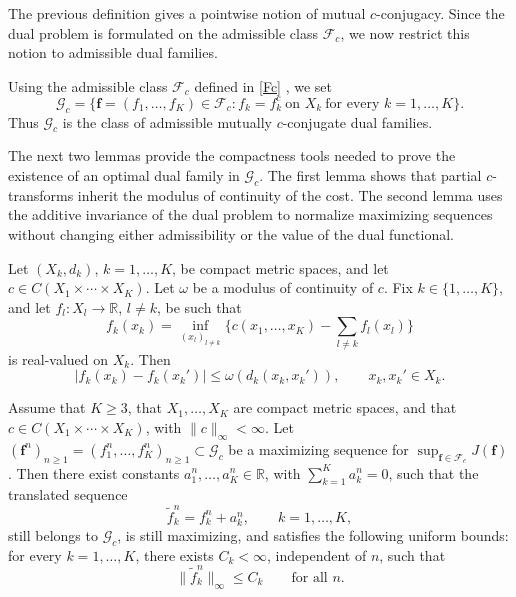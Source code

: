 \documentclass[twoside,11pt,a4paper]{article}
\newcommand*{\SavedEqref}{}
\let\SavedEqref\eqref
\renewcommand*{\eqref}[1]{  \begingroup
    \hypersetup{
      linkcolor=linkequation,
      linkbordercolor=linkequation,
    }    \SavedEqref{#1}  \endgroup
}
\begin{document}
The previous definition gives a pointwise notion of mutual \(c\)-conjugacy. Since the dual problem is formulated on the admissible class \(\mathcal F_c\), we now restrict this notion to admissible dual families.


\begin{definition}\label{Gc}
Using the admissible class \(\mathcal F_c\) defined in \eqref{Fc}, we set
\[
\mathcal G_c
=
\Big\{
\boldsymbol f=(f_1,\ldots,f_K)\in\mathcal F_c:
 f_k=f_k^{c}\ \text{on }X_k
\ \text{for every }k=1,\ldots,K
\Big\}.
\]
Thus \(\mathcal G_c\) is the class of admissible mutually \(c\)-conjugate dual
families.
\end{definition}
\medskip

The next two lemmas provide the compactness tools needed to prove the existence of an optimal dual family in \(\mathcal G_c\). The first lemma shows that partial \(c\)-transforms inherit the modulus of continuity of the cost. The second lemma uses the additive invariance of the dual problem to normalize maximizing sequences without changing either admissibility or the value of the dual functional.



\begin{lemma}\label{equi}
Let \((X_k,d_k)\), \(k=1,\ldots,K\), be compact metric spaces, and let \(c\in C(X_1\times\cdots\times X_K)\). Let \(\omega\) be a modulus of continuity of \(c\). Fix \(k\in\{1,\ldots,K\}\), and let \(f_l:X_l\to\mathbb R\), \(l\ne k\), be such that \[ f_k(x_k) = \inf_{(x_l)_{l\ne k}} \Big\{ c(x_1,\ldots,x_K)-\sum_{l\ne k}f_l(x_l) \Big\} \] is real-valued on \(X_k\). Then 
\[ |f_k(x_k)-f_k(x_k')| \le \omega(d_k(x_k,x_k')), \qquad x_k,x_k'\in X_k. 
\]
\end{lemma}




\begin{lemma}\label{uniform-bounds}
Assume that \(K\ge 3\), that \(X_1,\ldots,X_K\) are compact metric spaces, and that \(c\in C(X_1\times\cdots\times X_K)\), with \(\|c\|_\infty<\infty\).
Let $
(\boldsymbol f^n)_{n\ge1}
=
(f_1^n,\dots,f_K^n)_{n\ge1}
\subset \mathcal G_c$
be a maximizing sequence for $
\sup_{\boldsymbol f\in\mathcal F_c}J(\boldsymbol f)$.
Then there exist constants \(a_1^n,\ldots,a_K^n\in\mathbb R\), with $
\sum_{k=1}^K a_k^n=0$,
such that the translated sequence
\[
\widetilde f_k^n=f_k^n+a_k^n,
\qquad k=1,\ldots,K,
\]
still belongs to \(\mathcal G_c\), is still maximizing, and satisfies the
following uniform bounds: for every \(k=1,\ldots,K\), there exists
\(C_k<\infty\), independent of \(n\), such that
\[
\|\widetilde f_k^n\|_\infty\le C_k
\qquad\text{for all }n.
\]
\end{lemma}
\end{document}
